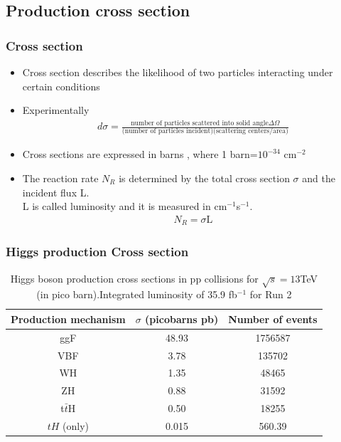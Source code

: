\documentclass[11pt]{beamer}
\begin{document}
\begin{frame}
\section{Production cross section}
\frametitle{Cross section}
\begin{itemize}
\item Cross section describes the likelihood of two particles interacting under certain conditions\cite{1}\cite{6}
\item Experimentally
\begin{align}
d\sigma=\frac{\text{number of particles scattered into solid angle} \Delta\Omega}{\text{(number of particles incident)(scattering centers/area)}}
\end{align}
\item Cross sections are expressed in barns , where 1 barn=$10^{-34}$ cm$^{-2}$ 
\item The reaction rate $N_R$ is determined by the total cross section $\sigma$ and the incident flux L.\\
L is called luminosity and it is measured in cm$^{-1}$s$^{-1}$.\cite{6}
\begin{align}
N_R=\sigma \text{L}
\end{align}
\end{itemize}
\end{frame}



\begin{frame}
\frametitle{Higgs production Cross section}
\begin{table}
	\caption*{Higgs boson production cross sections  in pp collisions for $\sqrt{s}=13$TeV  (in
		pico barn).Integrated luminosity of 35.9 fb$^{-1}$ for Run 2\footnotemark}
	\begin{tabular}{|c|c|c|}
		\hline
		Production mechanism &
		$\sigma$ (picobarns pb)
		&Number of events \\
		\hline
		ggF &
		48.93 &
		1756587\\
		\hline
		VBF &
		3.78&
		135702\\
		\hline
		WH & 1.35 & 48465\\
		\hline
		ZH &0.88 & 31592\\
		\hline
		t$\bar{t}$H &
		0.50&
		18255\\
		\hline
		$tH$	(only)&
		0.015&
		560.39\\
		\hline
	\end{tabular}
\end{table}


\end{frame}
\end{document}
